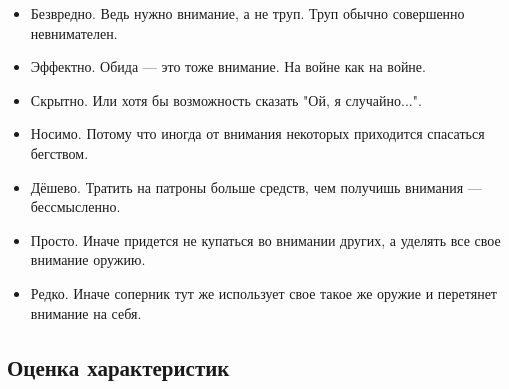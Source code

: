 \begin{itemize}
    \item \alert{Безвредно}. Ведь нужно внимание, а не труп. Труп обычно совершенно невнимателен.
    
    \item \alert{Эффектно}. Обида --- это тоже внимание. На войне как на войне.
    
    \item \alert{Скрытно}. Или хотя бы возможность сказать "Ой, я случайно...".
    
    \item \alert{Носимо}. Потому что иногда от внимания некоторых приходится спасаться бегством.
    
    \item \alert{Дёшево}. Тратить на патроны больше средств, чем получишь внимания --- бессмысленно.
    
    \item \alert{Просто}. Иначе придется не купаться во внимании других, а уделять все свое внимание оружию.

    \item \alert{Редко}. Иначе соперник тут же использует свое такое же оружие и перетянет внимание на себя.
\end{itemize}


\subsection{Оценка характеристик}


